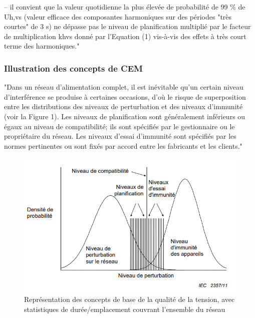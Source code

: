 – il convient que la valeur quotidienne la plus élevée de probabilité de 99 \% de Uh,vs (valeur efficace des composantes harmoniques sur des périodes "très courtes" de 3 s) ne dépasse pas le niveau de planification multiplié par le facteur de multiplication khvs donné par l'Equation (1) vis-à-vis des effets à très court terme des harmoniques."



\subsubsection{Illustration des concepts de CEM}

"Dans un réseau d'alimentation complet, il est inévitable qu'un certain niveau d'interférence se produise à certaines occasions, d'où le risque de superposition entre les distributions des niveaux de perturbation et des niveaux d'immunité (voir la Figure 1). Les niveaux de planification sont généralement inférieurs ou égaux au niveau de compatibilité; ils sont spécifiés par le gestionnaire ou le propriétaire du réseau. Les niveaux d'essai d'immunité sont spécifiés par les normes pertinentes ou sont fixés par accord entre les fabricants et les clients."

\begin{figure}[H]
    \begin{center}
        \includegraphics[width=\textwidth]{assets/figures/IECTR61000_tab2.png}
    \end{center}
    \caption{Représentation des concepts de base de la qualité de la tension, avec statistiques de durée/emplacement couvrant l'ensemble du réseau}
    \label{IECTR61000_tab2}
\end{figure}


